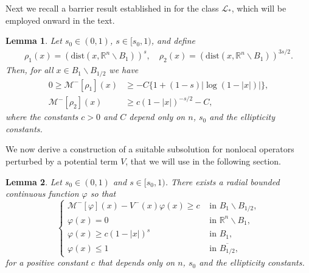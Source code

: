 \documentclass[11pt]{article}
\newtheorem{lemma}{Lemma}
\begin{document}
Next we recall a barrier result established in \cite{ros2016boundary} for the class $\mathcal{L}_{*}$, which will be employed onward in the text. 
\begin{lemma}\label{rho}
    Let \(s_0\in(0,1)\), \(s\in[s_0,1)\), and define
\begin{align*}
    \rho_{1}(x) = (\mathrm{dist}(x, \mathbb{R}^{n}\backslash B_{1}))^{s},  
    \quad
    \rho_{2}(x) = (\mathrm{dist}(x, \mathbb{R}^{n}\backslash B_{1}))^{3s/2}. 
\end{align*} Then, for all \(x\in B_{1}\backslash B_{1/2}\) we have
    \begin{align*}
        0  \geq \mathcal{M}^{-}[\rho_{1}](x) &\geq -C\{1+(1-s)|\log(1-|x|)|\}, \\
        \mathcal{M}^{-}[\rho_{2}](x) &\geq c(1-|x|)^{-s/2} - C,
    \end{align*}
    where the constants \(c>0\) and \(C\) depend only on \(n\), \(s_0\) and the ellipticity constants.
\end{lemma}

We now derive a construction of a suitable subsolution for nonlocal operators perturbed by a potential term \(V\), that we will use in the following section. 

\begin{lemma}\label{supersolucion}
Let $s_0\in(0,1)$ and $s\in[s_0,1)$. There exists a radial  bounded continuous function $\varphi$ so that
\begin{equation}\label{rosoton1}
\begin{cases}
    \mathcal{M}^{-}[\varphi](x) - V^{-}(x)\varphi(x) \geq c & \text{ in } B_{1} \backslash B_{1/2}, \\ 
    \varphi(x) = 0 & \text{ in } \mathbb{R}^{n} \backslash B_{1}, \\
    \varphi(x) \geq c(1-|x|)^{s} & \text{ in } B_{1}, \\
    \varphi(x) \leq 1 & \text{ in } \overline{B_{1/2}},
\end{cases}
\end{equation}
for a positive constant $c$ that depends only on $n$, $s_0$ and the ellipticity constants.
\end{lemma}
\end{document}
